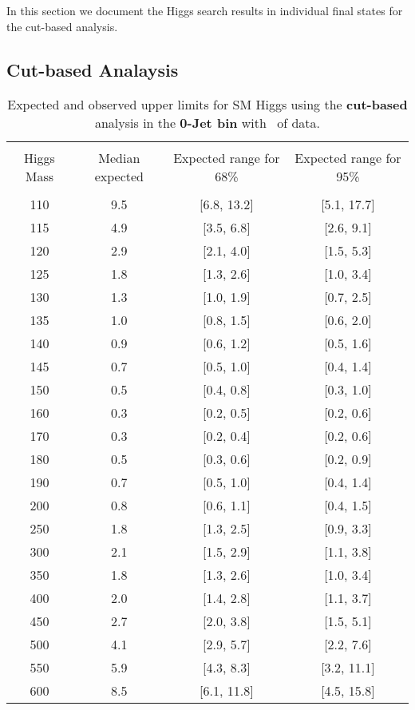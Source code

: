 In this section we document the Higgs search results in individual final states for the cut-based analysis.  

\subsection{Cut-based Analaysis}
\begin{table}[hbp!]
\begin{center}
\begin{tabular}{c c c c}
\hline
\vspace{-3mm} && \\
 Higgs Mass   & Median expected & Expected range for 68\% & Expected range for 95\%   \\
\vspace{-3mm} && \\
\hline
110 & 9.5 & [6.8, 13.2] & [5.1, 17.7] \\
115 & 4.9 & [3.5, 6.8] & [2.6, 9.1] \\
120 & 2.9 & [2.1, 4.0] & [1.5, 5.3] \\
125 & 1.8 & [1.3, 2.6] & [1.0, 3.4] \\
130 & 1.3 & [1.0, 1.9] & [0.7, 2.5] \\
135 & 1.0 & [0.8, 1.5] & [0.6, 2.0] \\
140 & 0.9 & [0.6, 1.2] & [0.5, 1.6] \\
145 & 0.7 & [0.5, 1.0] & [0.4, 1.4] \\
150 & 0.5 & [0.4, 0.8] & [0.3, 1.0] \\
160 & 0.3 & [0.2, 0.5] & [0.2, 0.6] \\
170 & 0.3 & [0.2, 0.4] & [0.2, 0.6] \\
180 & 0.5 & [0.3, 0.6] & [0.2, 0.9] \\
190 & 0.7 & [0.5, 1.0] & [0.4, 1.4] \\
200 & 0.8 & [0.6, 1.1] & [0.4, 1.5] \\
250 & 1.8 & [1.3, 2.5] & [0.9, 3.3] \\
300 & 2.1 & [1.5, 2.9] & [1.1, 3.8] \\
350 & 1.8 & [1.3, 2.6] & [1.0, 3.4] \\
400 & 2.0 & [1.4, 2.8] & [1.1, 3.7] \\
450 & 2.7 & [2.0, 3.8] & [1.5, 5.1] \\
500 & 4.1 & [2.9, 5.7] & [2.2, 7.6] \\
550 & 5.9 & [4.3, 8.3] & [3.2, 11.1] \\
600 & 8.5 & [6.1, 11.8] & [4.5, 15.8] \\
\hline
\end{tabular}
\caption{Expected and observed upper limits for SM Higgs using the
  {\bf cut-based} analysis in the {\bf 0-Jet bin} with \intlumiEightTeV\ of data.}
\label{tab:cutbase_uls_0j}
\end{center}
\end{table}

